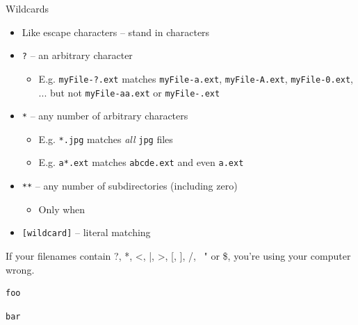 
\begin{frame}{Wildcards}
%
\begin{itemize}
\item Like escape characters -- stand in characters
\item \texttt{?} -- an arbitrary character
	\begin{itemize}
	\item E.\;g. \texttt{myFile-?.ext} matches \texttt{myFile-a.ext}, \texttt{myFile-A.ext}, \texttt{myFile-0.ext}, ... but not \texttt{myFile-aa.ext} or
	\texttt{myFile-.ext}
	\end{itemize}
\item \texttt{*} -- any number of arbitrary characters
	\begin{itemize}
	\item E.\;g. \texttt{*.jpg} matches \emph{all} \texttt{jpg} files
	\item E.\;g. \texttt{a*.ext} matches \texttt{abcde.ext} and even \texttt{a.ext}
	\end{itemize}
\item \texttt{**} -- any number of subdirectories (including zero)
	\begin{itemize}
	\item Only when 
	\end{itemize}
\item \texttt{[wildcard]} -- literal matching
\end{itemize}
%
\begin{hintbox}
If your filenames contain ?, *, <, |, >, [, ], /, \, " or \$, you're using your computer wrong.
\end{hintbox}
%
\end{frame}


\begin{frame}[fragile]
%
\begin{tcbraster}[raster columns=2,
                  raster equal height,
                  nobeforeafter,
                  raster column skip=0.5cm]
\begin{codebox}
\begin{verbatim}
foo
\end{verbatim}
\end{codebox}
%
\begin{codebox}
\begin{verbatim}
bar
\end{verbatim}
\end{codebox}
\end{tcbraster}
%
\end{frame}


